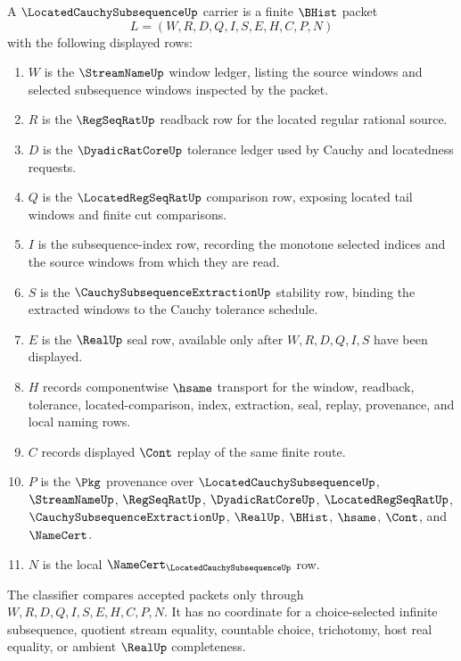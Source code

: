 \begin{definition}
\label{def:located-cauchy-subsequence-carrier}
A $\LocatedCauchySubsequenceUp$ carrier is a finite $\BHist$ packet
$$
L=(W,R,D,Q,I,S,E,H,C,P,N)
$$
with the following displayed rows:
\begin{enumerate}
\item $W$ is the $\StreamNameUp$ window ledger, listing the source windows and selected subsequence windows inspected by the packet.
\item $R$ is the $\RegSeqRatUp$ readback row for the located regular rational source.
\item $D$ is the $\DyadicRatCoreUp$ tolerance ledger used by Cauchy and locatedness requests.
\item $Q$ is the $\LocatedRegSeqRatUp$ comparison row, exposing located tail windows and finite cut comparisons.
\item $I$ is the subsequence-index row, recording the monotone selected indices and the source windows from which they are read.
\item $S$ is the $\CauchySubsequenceExtractionUp$ stability row, binding the extracted windows to the Cauchy tolerance schedule.
\item $E$ is the $\RealUp$ seal row, available only after $W,R,D,Q,I,S$ have been displayed.
\item $H$ records componentwise $\hsame$ transport for the window, readback, tolerance, located-comparison, index, extraction, seal, replay, provenance, and local naming rows.
\item $C$ records displayed $\Cont$ replay of the same finite route.
\item $P$ is the $\Pkg$ provenance over $\LocatedCauchySubsequenceUp$, $\StreamNameUp$, $\RegSeqRatUp$, $\DyadicRatCoreUp$, $\LocatedRegSeqRatUp$, $\CauchySubsequenceExtractionUp$, $\RealUp$, $\BHist$, $\hsame$, $\Cont$, and $\NameCert$.
\item $N$ is the local $\NameCert_{\LocatedCauchySubsequenceUp}$ row.
\end{enumerate}
The classifier compares accepted packets only through $W,R,D,Q,I,S,E,H,C,P,N$. It has no coordinate for a choice-selected infinite subsequence, quotient stream equality, countable choice, trichotomy, host real equality, or ambient $\RealUp$ completeness.
\end{definition}

